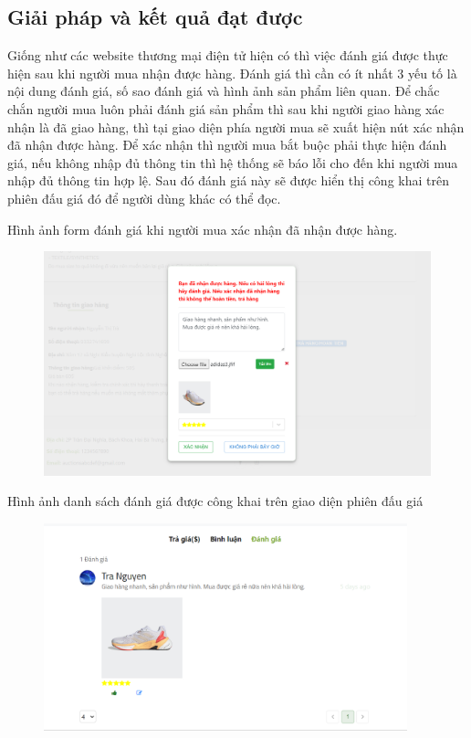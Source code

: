 \documentclass[../DoAn.tex]{subfiles}
\begin{document}
\subsection{Giải pháp và kết quả đạt được}
Giống như các website thương mại điện tử hiện có thì việc đánh giá được thực hiện sau khi người mua nhận được hàng. Đánh giá thì cần có ít nhất 3 yếu tố là nội dung đánh giá, số sao đánh giá và hình ảnh sản phẩm liên quan. Để chắc chắn người mua luôn phải đánh giá sản phẩm thì sau khi người giao hàng xác nhận là đã giao hàng, thì tại giao diện phía người mua sẽ xuất hiện nút xác nhận đã nhận được hàng. Để xác nhận thì người mua bắt buộc phải thực hiện đánh giá, nếu không nhập đủ thông tin thì hệ thống sẽ báo lỗi cho đến khi người mua nhập đủ thông tin hợp lệ. Sau đó đánh giá này sẽ được hiển thị công khai trên phiên đấu giá đó để người dùng khác có thể đọc.

Hình ảnh form đánh giá khi người mua xác nhận đã nhận được hàng.
\begin{figure}[H]
    \centering
    \includegraphics[width=0.75\linewidth,height=6.5cm]{Hinhve/rate.png}
\end{figure}
Hình ảnh danh sách đánh giá được công khai trên giao diện phiên đấu giá
\begin{figure}[H]
    \centering
    \includegraphics[width=0.75\linewidth,height=6cm]{Hinhve/listrate1.png}
\end{figure}
\newpage
\end{document}
